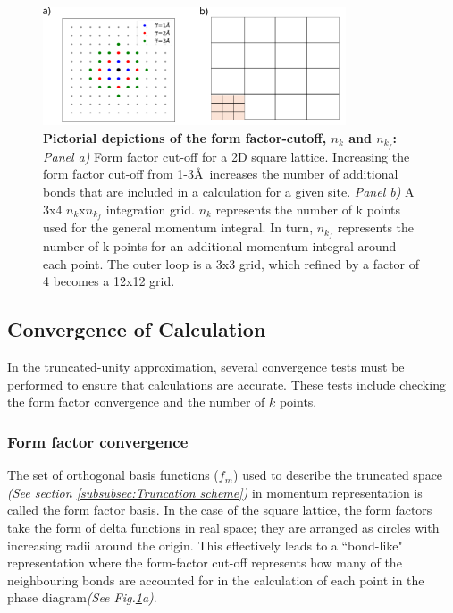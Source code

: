 \documentclass[12pt]{article}
\begin{document}
\begin{figure}[htbp]  %
    \centering
    \includegraphics[width=0.8\textwidth]{nknkfff.png}  %
    \caption{\textbf{Pictorial depictions of the form factor-cutoff, $n_k$ and $n_{k_f}$:} \textit{Panel a)}
    Form factor cut-off for a 2D square lattice. 
    Increasing the form factor cut-off from 1-3\AA\  increases the number of additional bonds
    that are included in a calculation for a given site. 
    \textit{Panel b)} A 3x4 $n_k$x$n_{k_f}$ integration grid. $n_k$ represents the number of k points used for the general momentum integral. In turn, 
    $n_{k_f}$ represents the number of k points for an additional momentum integral around each point. The outer loop is a 3x3 grid, which refined 
    by a factor of 4 becomes a 12x12 grid.}
    \label{fig:nknkf}
\end{figure}
 

\subsection{Convergence of Calculation}
\label{subsec:convergence}
In the truncated-unity approximation, several convergence tests must be performed to ensure that calculations are accurate.
These tests include checking the form factor convergence and the number of $k$ points.

\subsubsection{Form factor convergence}

The set of orthogonal basis functions ($f_m$) used to describe the truncated space \textit{(See section \ref{subsubsec:Truncation scheme})}
in momentum representation is called the form factor basis\cite{lichtenstein2018functional}. In the case of the square lattice, 
the form factors take the form of delta functions in real space; they are arranged as circles with increasing radii around the origin. This effectively leads to a ``bond-like" representation where the form-factor cut-off
represents how many of the neighbouring bonds are accounted for in the calculation of each point in the phase diagram\textit{(See Fig.\ref{fig:nknkf}a)}.\par
\end{document}
